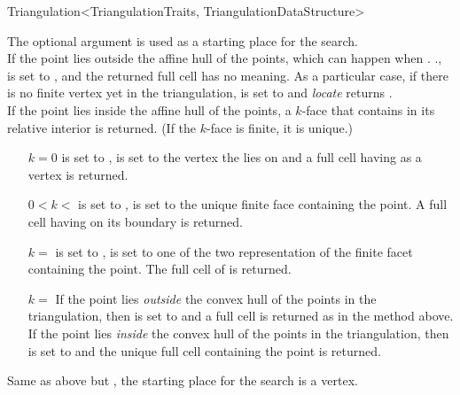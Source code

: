 \begin{ccRefClass}{Triangulation<TriangulationTraits, TriangulationDataStructure>}
{The optional argument  is used as a starting place for the
search.\\ If the  point lies outside the affine hull of the points,
which can happen when \ccVar.
\ccVar.,  is set to
, and the returned full cell has no meaning. As a
particular case, if there is no finite vertex yet in the triangulation,
 is set to  and \textit{locate} returns
.\\ If the  point lies inside the affine hull
of the points, a $k$-face that contains  {in its relative
interior} is returned. (If the $k$-face is finite, it is
unique.)\begin{itemize} \item[$k=0$]  is set to ,
 is set to the vertex  the  lies on and a full cell
having  as a vertex is returned.
\item[$0<k<$\ccc{c.current_dimension()-1}]  is set to
,  is set to the unique finite face containing the
 point. A full cell having  on its boundary is returned.
\item[$k=$\ccc{c.current_dimension()-1}]  is set to
,  is set to one of the two representation of
the finite facet containing the
 point. The full cell of  is returned.
\item[$k=$\ccc{c.current_dimension()}] If the  point lies
{\em outside} the convex hull of the points in the triangulation, then
 is set to  and a full cell is returned
as in the  method above. If the  point lies
{\em inside} the convex hull of the points in the triangulation, then
 is set to  and the unique full cell containing
the  point is returned. \end{itemize}}

{Same as above but , the starting place for the search is a vertex.}



\end{ccRefClass}
